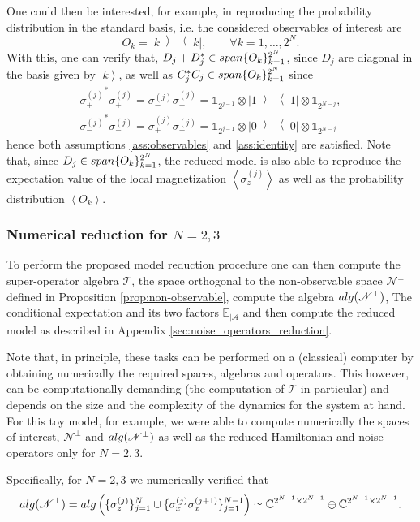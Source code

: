 \documentclass[aihp,12pt]{imsart}
\newcommand{\As}{\mathscr{A}}
\newcommand{\Ns}{\mathscr{N}}
\newcommand{\Ts}{\mathscr{T}}
\newcommand{\Cb}{\mathbb{C}}
\newcommand{\Eb}{\mathbb{E}}
\newcommand{\one}{\mathbb{1}}
\newcommand{\Span}{{\rm span}}
\newcommand{\alg}{{\rm alg}}
\newcommand{\ket}[1]{\left| #1 \right>}
\newcommand{\expect}[1]{\left< #1 \right>}
\newcommand{\ketbra}[2]{\left\vert #1 \middle>\middle< #2 \right\vert}
\theoremstyle{theorem}
\theoremstyle{definition}
\theoremstyle{remark}
\begin{document}
One could then be interested, for example, in reproducing the probability distribution in the standard basis, i.e. the considered observables of interest are
\[ O_k = \ketbra{k}{k}, \qquad \forall k = 1,\dots,2^{N}.\]
With this, one can verify that, $D_j+D_j^*\in\Span\{O_k\}_{k=1}^{2^N}$, since $D_j$ are diagonal in the basis given by $\ket{k}$,
as well as $C_j^* C_j\in\Span\{O_k\}_{k=1}^{2^N}$ since 
\begin{align*}
    {\sigma_+^{(j)}}^*\sigma_{+}^{(j)} = \sigma_{-}^{(j)}\sigma_+^{(j)} = \one_{2^{j-1}} \otimes \ketbra{1}{1}\otimes \one_{2^{N-j}},\\ 
    {\sigma_-^{(j)}}^*\sigma_{-}^{(j)} = \sigma_{+}^{(j)}\sigma_-^{(j)} = \one_{2^{j-1}} \otimes \ketbra{0}{0}\otimes \one_{2^{N-j}} 
\end{align*}
hence both assumptions \ref{ass:observables} and \ref{ass:identity} are satisfied. Note that, since $D_j\in\Span\{O_k\}_{k=1}^{2^N}$, the reduced model is also able to reproduce the expectation value of the local magnetization $\expect{\sigma_z^{(j)}}$ as well as the probability distribution $\expect{O_k}$. 

\subsubsection{Numerical reduction for $N=2,3$}
To perform the proposed model reduction procedure one can then compute the super-operator algebra $\Ts$, the space orthogonal to the non-observable space $\Ns^\perp$ defined in Proposition \ref{prop:non-observable}, compute the algebra $\alg(\Ns^\perp)$, The conditional expectation and its two factors $\Eb_{|\As}$ and then compute the reduced model as described in Appendix \ref{sec:noise_operators_reduction}. 

Note that, in principle, these tasks can be performed on a (classical) computer by obtaining numerically the required spaces, algebras and operators. This however, can be computationally demanding (the computation of $\Ts$ in particular) and depends on the size and the complexity of the dynamics for the system at hand. 
For this toy model, for example, we were able to compute numerically the spaces of interest, $\Ns^\perp$ and $\alg(\Ns^\perp)$ as well as the reduced Hamiltonian and noise operators only for $N=2,3$. 

Specifically, for $N=2,3$ we numerically verified that
\begin{equation}
    \alg(\Ns^\perp) =  \alg\left(\{ \sigma_z^{(j)}\}_{j=1}^N\cup\{\sigma_x^{(j)}\sigma_x^{(j+1)}\}_{j=1}^{N-1}\right)\simeq \Cb^{2^{N-1} \times 2^{N-1}} \oplus \Cb^{2^{N-1} \times 2^{N-1}}.
    \label{eq:example_algebra}
\end{equation}
\end{document}
